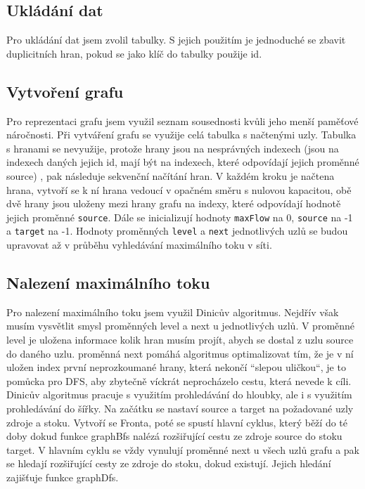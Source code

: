 \documentclass[12pt,a4paper]{article}
\begin{document}
	 \subsection{Ukládání dat}
	 Pro ukládání dat jsem zvolil tabulky. S jejich použitím je jednoduché se zbavit duplicitních hran, pokud se jako klíč do tabulky použije id.
	 \subsection{Vytvoření grafu}
	 Pro reprezentaci grafu jsem využil seznam sousednosti kvůli jeho menší paměťové náročnosti. Při vytváření grafu se využije celá tabulka s načtenými uzly. Tabulka s hranami se nevyužije, protože hrany jsou na nesprávných indexech (jsou na indexech daných jejich id, mají být na indexech, které odpovídají jejich proměnné source) , pak následuje sekvenční načítání hran. V každém kroku je načtena hrana, vytvoří se k ní hrana vedoucí v opačném směru s nulovou kapacitou, obě dvě hrany jsou uloženy mezi hrany grafu na indexy, které odpovídají hodnotě jejich proměnné \texttt{source}. Dále se inicializují hodnoty \texttt{maxFlow} na 0, \texttt{source} na -1 a \texttt{target} na -1. Hodnoty proměnných \texttt{level} a \texttt{next} jednotlivých uzlů se budou upravovat až v průběhu vyhledávání maximálního toku v síti.
	 \newpage
	 \subsection{Nalezení maximálního toku}
	 Pro nalezení maximálního toku jsem využil Dinicův algoritmus. Nejdřív však musím vysvětlit smysl proměnných level a next u jednotlivých uzlů. V proměnné level je uložena informace kolik hran musím projít, abych se dostal z uzlu source do daného uzlu. proměnná next pomáhá algoritmus optimalizovat tím, že je v ní uložen index první neprozkoumané hrany, která nekončí “slepou uličkou“, je to pomůcka pro DFS, aby zbytečně víckrát neprocházelo cestu, která nevede k cíli. Dinicův algoritmus pracuje s využitím prohledávání do hloubky, ale i s využitím prohledávání do šířky. Na začátku se nastaví source a target na požadované uzly zdroje a stoku. Vytvoří se Fronta, poté se spustí hlavní cyklus, který běží do té doby dokud funkce graphBfs nalézá rozšiřující cestu ze zdroje source do stoku target. V hlavním cyklu se vždy vynulují proměnné next u všech uzlů grafu a pak se hledají rozšiřující cesty ze zdroje do stoku, dokud existují. Jejich hledání zajišťuje funkce graphDfs.
\end{document}

